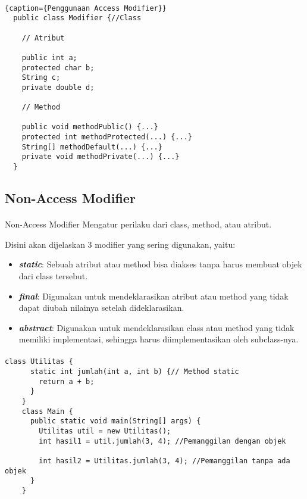 \documentclass{../praktikum-ppt}
\begin{document}
    \begin{frame}[fragile]{\insertsection}
      \framesubtitle{\insertsubsection}
      \begin{lstlisting}{caption={Penggunaan Access Modifier}}
  public class Modifier {//Class

    // Atribut

    public int a; 
    protected char b; 
    String c; 
    private double d; 
    
    // Method

    public void methodPublic() {...} 
    protected int methodProtected(...) {...} 
    String[] methodDefault(...) {...} 
    private void methodPrivate(...) {...} 
  }
      \end{lstlisting}
    \end{frame}

    \subsection{Non-Access Modifier}
    \begin{frame}{\insertsection}
      \framesubtitle{\insertsubsection}
      \begin{block}{Non-Access Modifier}
        Mengatur perilaku dari class, method, atau atribut.
      \end{block}
      Disini akan dijelaskan 3 modifier yang sering digunakan, yaitu:
      \begin{itemize}
        \item \textbf{\textit{static}}: Sebuah atribut atau method bisa diakses tanpa harus membuat objek dari class tersebut.
        \item \textbf{\textit{final}}: Digunakan untuk mendeklarasikan atribut atau method yang tidak dapat diubah nilainya setelah dideklarasikan.
        \item \textbf{\textit{abstract}}: Digunakan untuk mendeklarasikan class atau method yang tidak memiliki implementasi, sehingga harus diimplementasikan oleh subclass-nya.
      \end{itemize}
    \end{frame}

    \begin{frame}[fragile]{\insertsection}
      \framesubtitle{\insertsubsection}
      \begin{lstlisting}[caption={Penggunaan \texttt{static} untuk method}]
    class Utilitas {
      static int jumlah(int a, int b) {// Method static
        return a + b;
      }
    }
    class Main {
      public static void main(String[] args) {
        Utilitas util = new Utilitas(); 
        int hasil1 = util.jumlah(3, 4); //Pemanggilan dengan objek
        
        int hasil2 = Utilitas.jumlah(3, 4); //Pemanggilan tanpa ada objek
      }
    }
      \end{lstlisting}
    \end{frame}
\end{document}
